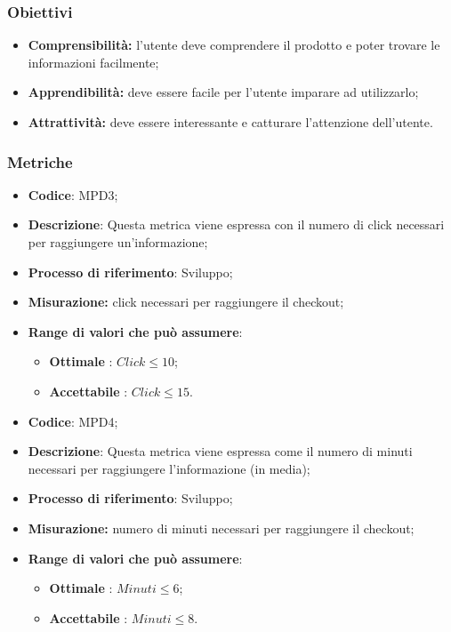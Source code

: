\subsubsection{Obiettivi}
\begin {itemize}
	\item \textbf{Comprensibilità:} l'utente deve comprendere il prodotto e poter trovare le informazioni facilmente;
	\item \textbf{Apprendibilità:} deve essere facile per l'utente imparare ad utilizzarlo;
	\item \textbf{Attrattività:} deve essere interessante e catturare l'attenzione dell'utente.
\end{itemize}
\subsubsection{Metriche}
\vspace{-1cm}
\begin{itemize}
	\item \textbf{Codice}: MPD3;
	\item \textbf{Descrizione}: Questa metrica viene espressa con il numero di click necessari per raggiungere un'informazione;
		\item \textbf{Processo di riferimento}: Sviluppo;
	\item \textbf{Misurazione:} click necessari per raggiungere il checkout;
	\item \textbf{Range di valori che può assumere}: 
		\begin{itemize}
			\item \textbf{Ottimale} : $Click \leq10$;
			\item \textbf{Accettabile} : $Click \leq15$.
		\end{itemize}
\end{itemize}
\vspace{-1cm}
\begin{itemize}
	\item \textbf{Codice}: MPD4;
	\item \textbf{Descrizione}: Questa metrica viene espressa come il numero di minuti necessari per raggiungere l'informazione (in media);
	\item \textbf{Processo di riferimento}: Sviluppo;
	\item \textbf{Misurazione:} numero di minuti necessari per raggiungere il checkout;
	\item \textbf{Range di valori che può assumere}: 
		\begin{itemize}
			\item \textbf{Ottimale} : $Minuti \leq6$;
			\item \textbf{Accettabile} : $Minuti \leq8$.
		\end{itemize}
\end{itemize}
